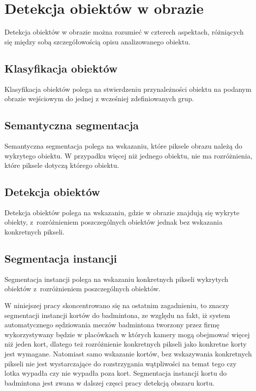 \section{Detekcja obiektów w obrazie}
\label{sec:typy_detekcji}

Detekcja obiektów w obrazie można rozumieć w czterech aspektach, różniących się między sobą szczegółowością opisu analizowanego obiektu. 

\subsection*{Klasyfikacja obiektów}
Klasyfikacja obiektów polega na stwierdzeniu przynależności obiektu na podanym obrazie wejściowym do jednej z wcześniej zdefiniowanych grup.
\subsection*{Semantyczna segmentacja}
Semantyczna segmentacja polega na wskazaniu, które piksele obrazu należą do wykrytego obiektu. W przypadku więcej niż jednego obiektu, nie ma rozróżnienia, które piksele dotyczą którego obiektu.
\subsection*{Detekcja obiektów}
Detekcja obiektów polega na wskazaniu, gdzie w obrazie znajdują się wykryte obiekty, z~rozróżnieniem poszczególnych obiektów jednak bez wskazania konkretnych pikseli.
\subsection*{Segmentacja instancji}
Segmentacja instancji polega na wskazaniu konkretnych pikseli wykrytych obiektów z~rozróżnieniem poszczególnych obiektów.



W niniejszej pracy skoncentrowano się na ostatnim zagadnieniu,  to znaczy segmentacji instancji kortów do badmintona, ze względu na fakt, iż system automatycznego sędziowania meczów badmintona tworzony przez firmę \blue{} wykorzystywany będzie w placówkach w których kamery mogą obejmować więcej niż jeden kort, dlatego też rozróżnienie konkretnych pikseli jako konkretne korty jest wymagane. Natomiast samo wskazanie kortów, bez wskazywania konkretnych pikseli nie jest wystarczające do rozstrzygania wątpliwości na temat tego czy lotka wypadła czy nie wypadła poza kort. Segmentacja instancji kortu do badmintona jest zwana w dalszej częsci pracy detekcją obszaru kortu.
